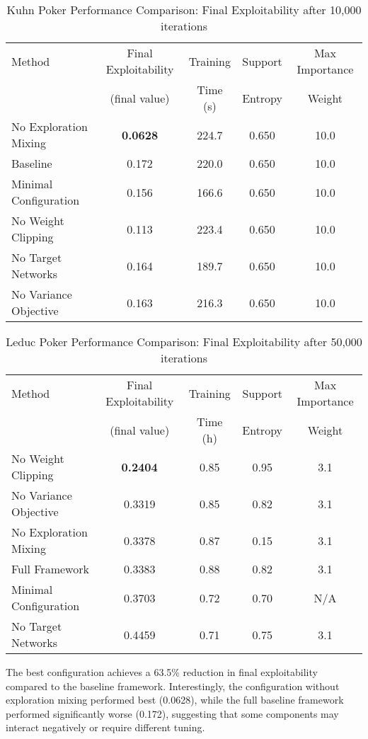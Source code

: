 \documentclass[12pt,a4paper]{article}
\begin{document}
\begin{table}[H]
\centering
\caption{Kuhn Poker Performance Comparison: Final Exploitability after 10,000 iterations}
\begin{tabular}{@{}lcccc@{}}
\toprule
Method & Final Exploitability & Training & Support & Max Importance \\
 & (final value) & Time (s) & Entropy & Weight \\
\midrule
No Exploration Mixing & \textbf{0.0628} & 224.7 & 0.650 & 10.0 \\
Baseline & 0.172 & 220.0 & 0.650 & 10.0 \\
Minimal Configuration & 0.156 & 166.6 & 0.650 & 10.0 \\
No Weight Clipping & 0.113 & 223.4 & 0.650 & 10.0 \\
No Target Networks & 0.164 & 189.7 & 0.650 & 10.0 \\
No Variance Objective & 0.163 & 216.3 & 0.650 & 10.0 \\
\bottomrule
\end{tabular}
\end{table}

\begin{table}[H]
\centering
\caption{Leduc Poker Performance Comparison: Final Exploitability after 50,000 iterations}
\begin{tabular}{@{}lcccc@{}}
\toprule
Method & Final Exploitability & Training & Support & Max Importance \\
 & (final value) & Time (h) & Entropy & Weight \\
\midrule
No Weight Clipping & \textbf{0.2404} & 0.85 & 0.95 & 3.1 \\
No Variance Objective & 0.3319 & 0.85 & 0.82 & 3.1 \\
No Exploration Mixing & 0.3378 & 0.87 & 0.15 & 3.1 \\
Full Framework & 0.3383 & 0.88 & 0.82 & 3.1 \\
Minimal Configuration & 0.3703 & 0.72 & 0.70 & N/A \\
No Target Networks & 0.4459 & 0.71 & 0.75 & 3.1 \\
\bottomrule
\end{tabular}
\end{table}

The best configuration achieves a 63.5\% reduction in final exploitability compared to the baseline framework. Interestingly, the configuration without exploration mixing performed best (0.0628), while the full baseline framework performed significantly worse (0.172), suggesting that some components may interact negatively or require different tuning.
\end{document}
